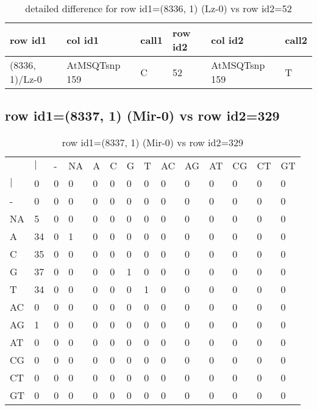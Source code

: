 \begin{center}
\begin{longtable}{|l|l|l|l|l|l|}
\caption{detailed difference for row id1=(8336, 1) (Lz-0) vs row id2=52} \label{table_dm535}\\
\hline
row id1&col id1&call1&row id2&col id2&call2\\
\hline
(8336, 1)/Lz-0&AtMSQTsnp 159&C&52&AtMSQTsnp 159&T\\
\hline
\end{longtable}
\end{center}

\subsection{row id1=(8337, 1) (Mir-0) vs row id2=329}
\begin{center}
\begin{longtable}{|l|l|l|l|l|l|l|l|l|l|l|l|l|l|}
\caption{row id1=(8337, 1) (Mir-0) vs row id2=329} \label{table_dm536}\\
\hline
\\
\hline
&$|$&-&NA&A&C&G&T&AC&AG&AT&CG&CT&GT\\
$|$&0&0&0&0&0&0&0&0&0&0&0&0&0\\
-&0&0&0&0&0&0&0&0&0&0&0&0&0\\
NA&5&0&0&0&0&0&0&0&0&0&0&0&0\\
A&34&0&1&0&0&0&0&0&0&0&0&0&0\\
C&35&0&0&0&0&0&0&0&0&0&0&0&0\\
G&37&0&0&0&0&1&0&0&0&0&0&0&0\\
T&34&0&0&0&0&0&1&0&0&0&0&0&0\\
AC&0&0&0&0&0&0&0&0&0&0&0&0&0\\
AG&1&0&0&0&0&0&0&0&0&0&0&0&0\\
AT&0&0&0&0&0&0&0&0&0&0&0&0&0\\
CG&0&0&0&0&0&0&0&0&0&0&0&0&0\\
CT&0&0&0&0&0&0&0&0&0&0&0&0&0\\
GT&0&0&0&0&0&0&0&0&0&0&0&0&0\\
\hline
\end{longtable}
\end{center}

